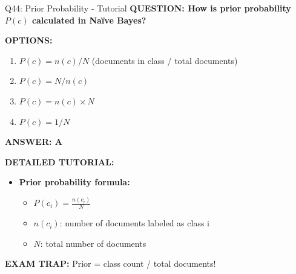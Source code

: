 \documentclass[8pt]{beamer}
\begin{document}
	\begin{frame}{Q44: Prior Probability - Tutorial}
		\fontsize{6.5}{7.5}\selectfont
		\textbf{QUESTION: How is prior probability $P(c)$ calculated in Naïve Bayes?}
		
		\vspace{0.1cm}
		\textbf{OPTIONS:}
		\begin{enumerate}
			\item $P(c) = n(c) / N$ (documents in class / total documents)
			\item $P(c) = N / n(c)$
			\item $P(c) = n(c) \times N$
			\item $P(c) = 1 / N$
		\end{enumerate}
		
		\vspace{0.1cm}
		\textcolor{myblue}{\textbf{ANSWER: A}}
		
		\vspace{0.1cm}
		\textbf{DETAILED TUTORIAL:}
		\begin{itemize}
			\item \textbf{Prior probability formula:}
			\begin{itemize}
				\item $P(c_i) = \frac{n(c_i)}{N}$
				\item $n(c_i)$: number of documents labeled as class i
				\item $N$: total number of documents
			\end{itemize}
		\end{itemize}
		
		\textcolor{myred}{\textbf{EXAM TRAP:}} Prior = \textcolor{myblue}{class count / total documents}!
	\end{frame}
	
\end{document}
